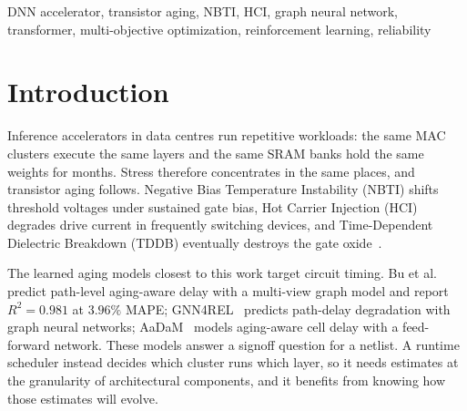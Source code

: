 \documentclass[conference]{IEEEtran}
\begin{document}
\begin{IEEEkeywords}
DNN accelerator, transistor aging, NBTI, HCI, graph neural network, transformer, multi-objective optimization, reinforcement learning, reliability
\end{IEEEkeywords}

\section{Introduction}
\label{sec:introduction}

Inference accelerators in data centres run repetitive workloads: the same MAC clusters execute the same layers and the same SRAM banks hold the same weights for months. Stress therefore concentrates in the same places, and transistor aging follows. Negative Bias Temperature Instability (NBTI) shifts threshold voltages under sustained gate bias, Hot Carrier Injection (HCI) degrades drive current in frequently switching devices, and Time-Dependent Dielectric Breakdown (TDDB) eventually destroys the gate oxide~\cite{hill2022cmos,kim2023reliability}.

The learned aging models closest to this work target circuit timing. Bu et al.~\cite{bu2024multiview} predict path-level aging-aware delay with a multi-view graph model and report $R^2 = 0.981$ at $3.96\%$ MAPE; GNN4REL~\cite{alrahis2022gnn4rel} predicts path-delay degradation with graph neural networks; AaDaM~\cite{ebrahimipour2020aadam} models aging-aware cell delay with a feed-forward network. These models answer a signoff question for a netlist. A runtime scheduler instead decides which cluster runs which layer, so it needs estimates at the granularity of architectural components, and it benefits from knowing how those estimates will evolve.
\end{document}
